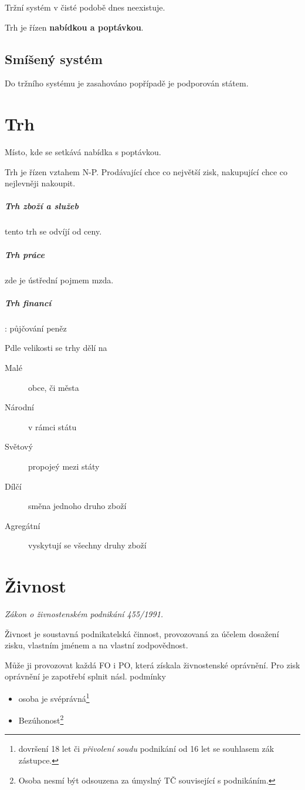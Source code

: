 \documentclass[10pt,a4paper,
twoside,%
]{report}
\begin{document}
Tržní systém v čisté podobě dnes neexistuje.

Trh je řízen \textbf{nabídkou a poptávkou}. 

\subsection{Smíšený systém}

Do tržního systému je zasahováno popřípadě je podporován státem.

\section{Trh}
\textsf{Místo, kde se setkává nabídka s poptávkou.}

Trh je řízen vztahem N-P. Prodávající chce co největší zisk, nakupující chce co nejlevněji nakoupit.

\subparagraph{Trh zboží a služeb} tento trh se odvíjí od ceny.

\subparagraph{Trh práce} zde je ústřední pojmem mzda.

\subparagraph{Trh financí}: půjčování peněz

Pdle velikosti se trhy dělí na 
\begin{description}
\item[Malé] obce, či města
\item[Národní] v rámci státu
\item[Světový] propojeý mezi státy
\item[Dílčí] směna jednoho druho zboží
\item[Agregátní] vyskytují se všechny druhy zboží
\end{description}

\section{Živnost}

\emph{Zákon o živnostenském podnikání 455/1991.}

Živnost je soustavná podnikatelská činnost, provozovaná za účelem dosažení zisku,  vlastním jménem a na vlastní zodpovědnost.

Může ji provozovat každá FO i PO, která získala živnostenské oprávnění. Pro zisk oprávnění je zapotřebí splnit násl. podmínky
\begin{multicols}{2}
\begin{itemize}
\item osoba je svéprávná\footnote{dovršení 18 let či \emph{přivolení soudu} podnikání od 16 let se souhlasem zák zástupce.}
\item Bezúhonost\footnote{Osoba nesmí být odsouzena za úmyslný TČ související s podnikáním.} 
\end{itemize}
\end{multicols}
\end{document}
